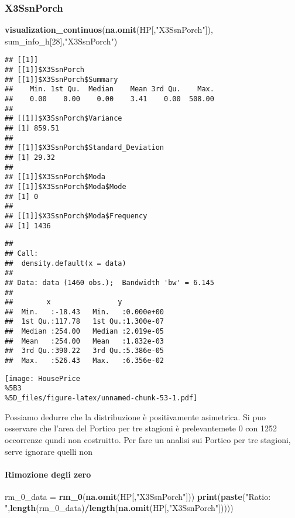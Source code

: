 \documentclass[
]{article}
\newenvironment{Shaded}{\begin{snugshade}}{\end{snugshade}}
\newcommand{\DecValTok}[1]{\textcolor[rgb]{0.00,0.00,0.81}{#1}}
\newcommand{\FunctionTok}[1]{\textcolor[rgb]{0.13,0.29,0.53}{\textbf{#1}}}
\newcommand{\NormalTok}[1]{#1}
\newcommand{\OtherTok}[1]{\textcolor[rgb]{0.56,0.35,0.01}{#1}}
\newcommand{\SpecialCharTok}[1]{\textcolor[rgb]{0.81,0.36,0.00}{\textbf{#1}}}
\newcommand{\StringTok}[1]{\textcolor[rgb]{0.31,0.60,0.02}{#1}}
\begin{document}
\subsubsection{X3SsnPorch}\label{x3ssnporch}

\begin{Shaded}
\begin{Highlighting}[]
\FunctionTok{visualization\_continuos}\NormalTok{(}\FunctionTok{na.omit}\NormalTok{(HP[,}\StringTok{"X3SsnPorch"}\NormalTok{]), sum\_info\_h[}\DecValTok{28}\NormalTok{],}\StringTok{"X3SsnPorch"}\NormalTok{)}
\end{Highlighting}
\end{Shaded}

\begin{verbatim}
## [[1]]
## [[1]]$X3SsnPorch
## [[1]]$X3SsnPorch$Summary
##    Min. 1st Qu.  Median    Mean 3rd Qu.    Max. 
##    0.00    0.00    0.00    3.41    0.00  508.00 
## 
## [[1]]$X3SsnPorch$Variance
## [1] 859.51
## 
## [[1]]$X3SsnPorch$Standard_Deviation
## [1] 29.32
## 
## [[1]]$X3SsnPorch$Moda
## [[1]]$X3SsnPorch$Moda$Mode
## [1] 0
## 
## [[1]]$X3SsnPorch$Moda$Frequency
## [1] 1436
\end{verbatim}

\begin{verbatim}
## 
## Call:
##  density.default(x = data)
## 
## Data: data (1460 obs.);  Bandwidth 'bw' = 6.145
## 
##        x                y            
##  Min.   :-18.43   Min.   :0.000e+00  
##  1st Qu.:117.78   1st Qu.:1.300e-07  
##  Median :254.00   Median :2.019e-05  
##  Mean   :254.00   Mean   :1.832e-03  
##  3rd Qu.:390.22   3rd Qu.:5.386e-05  
##  Max.   :526.43   Max.   :6.356e-02
\end{verbatim}

\texttt{[image: HousePrice\\\%5B3\\\%5D\_files/figure-latex/unnamed-chunk-53-1.pdf]}

Possiamo dedurre che la distribuzione è positivamente asimetrica. Si puo
osservare che l'area del Portico per tre stagioni è prelevantemete 0 con
1252 occorrenze qundi non costruitto. Per fare un analisi sui Portico
per tre stagioni, serve ignorare quelli non

\paragraph{Rimozione degli zero}\label{rimozione-degli-zero-11}

\begin{Shaded}
\begin{Highlighting}[]
\NormalTok{rm\_0\_data }\OtherTok{=} \FunctionTok{rm\_0}\NormalTok{(}\FunctionTok{na.omit}\NormalTok{(HP[,}\StringTok{"X3SsnPorch"}\NormalTok{]))}
\FunctionTok{print}\NormalTok{(}\FunctionTok{paste}\NormalTok{(}\StringTok{"Ratio: "}\NormalTok{,}\FunctionTok{length}\NormalTok{(rm\_0\_data)}\SpecialCharTok{/}\FunctionTok{length}\NormalTok{(}\FunctionTok{na.omit}\NormalTok{(HP[,}\StringTok{"X3SsnPorch"}\NormalTok{]))))}
\end{Highlighting}
\end{Shaded}
\end{document}
